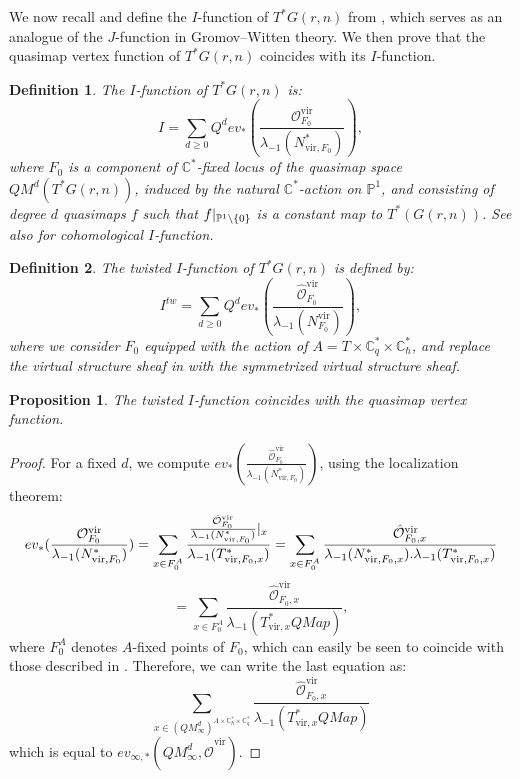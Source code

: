 \documentclass{amsart}
\newtheorem{definition}{Definition}
\newtheorem{prop}[thm]{Proposition}
\newcommand{\C}{{\mathbb C}}
\begin{document}
We now recall and define the $I$-function of $T^*G(r,n)$ from \cite{wen2019ktheoreticifunctionvthetamathbfg}, which serves as an analogue of the $J$-function in Gromov--Witten theory. We then prove that the quasimap vertex function of $T^*G(r,n)$ coincides with its $I$-function. 
\begin{definition}\label{I-function definition}
    The $I$-function of $T^*G(r,n)$ is:
    \[
I=\sum_{d \geq 0}Q^dev_*(\frac{\mathcal{O}_{F_0}^{\mathrm{vir}}}{\lambda_{-1}(N_{\mathrm{vir},F_0}^{*})}),
\]
where $F_0$ is a component of $\mathbb{C}^*$-fixed locus of the quasimap space $QM^d(T^*G(r,n))$, induced by the natural $\mathbb{C}^*$-action on $\mathbb{P}^1$, and consisting of degree $d$ quasimaps $f$ such that $f\arrowvert_{\mathbb{P}^1 \setminus \{0\}}$ is a constant map to $T^*(G(r,n))$. See also \cite{CKM, MR4167521} for cohomological $I$-function.
\end{definition}
\begin{definition}
    The twisted $I$-function of $T^*G(r,n)$ is defined by:
    \[
   I^{tw}= \sum_{d \geq 0}Q^dev_*(\frac{\hat{\mathcal{O}}^{{\mathrm{vir}}}_{F_0}}{\lambda_{-1}(N_{F_0}^{\mathrm{vir}})}),
    \]
    where we consider $F_0$ equipped with the action of $A=T \times \C_q^* \times \C_\hbar^*$, and replace the virtual structure sheaf in  with the symmetrized virtual structure sheaf.
\end{definition}


\begin{prop}\label{prop:V=I}
    The twisted $I$-function coincides with the quasimap vertex function.
\end{prop}
\begin{proof}
    For a fixed $d$, we compute $ev_*(\frac{\hat{\mathcal{O}}^{{\mathrm{vir}}}_{F_0}}{\lambda_{-1}(N_{\mathrm{vir},F_0}^{*})})$, using the localization theorem:
    \[
ev_*(\frac{\mathcal{O}_{F_0}^{\mathrm{vir}}}{\lambda_{-1}({N}_{\mathrm{vir},F_0}^{*})}) =\sum_{x \in F_0^{A}}  \frac{\frac{\hat{\mathcal{O}}^{{\mathrm{vir}}}_{F_0}}{\lambda_{-1}({N}_{\mathrm{vir},F_0}^{*})}\arrowvert_{x}}{\lambda_{-1}({T}_{\mathrm{vir},F_0,x}^{*})} = \sum_{x \in F_0^{A}}\frac{\hat{\mathcal{O}}^{{\mathrm{vir}}}_{F_0,x}}{\lambda_{-1}({N}_{\mathrm{vir},F_0,x}^{*}).\lambda_{-1}({T}_{\mathrm{vir},F_0,x}^{*})}
\]
\[
= \sum_{x \in F_0^{A}}\frac{\hat{\mathcal{O}}^{{\mathrm{vir}}}_{F_0,x}}{\lambda_{-1}(T^*_{\mathrm{vir},x}QMap)},
\]
where $F_0^{A}$ denotes $A$-fixed points of $F_0$, which can easily be seen to coincide with those described in . Therefore, we can write the last equation as:
\[
\sum_{x \in (QM_{\infty}^d)^{A \times \mathbb{C}_{\hbar}^* \times \mathbb{C}_q^*}}\frac{\hat{\mathcal{O}}^{{\mathrm{vir}}}_{F_0,x}}{\lambda_{-1}(T^*_{\mathrm{vir},x}QMap)}
\]
which is equal to $ev_{{\infty},*}(QM^d_{\infty},\hat{\mathcal{O}}^{{\mathrm{vir}}})$.
\end{proof}
\end{document}
